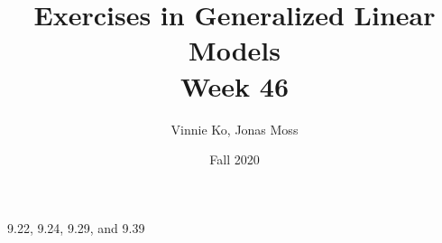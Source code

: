 \documentclass{article}
\title{Exercises in Generalized Linear Models \\ \textbf{Week 46}}
\author{Vinnie Ko, Jonas Moss}
\date{Fall 2020}
\begin{document}
\maketitle

9.22, 9.24, 9.29, and 9.39









\printbibliography
\end{document}
